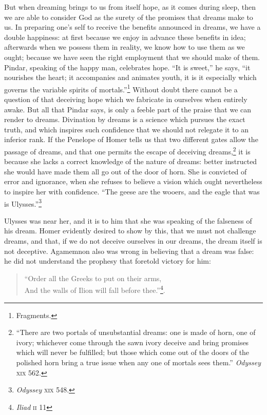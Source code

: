 \documentclass[12pt]{article}
\begin{document}
But when dreaming brings to us from itself hope, as it comes during sleep, then
we are able to consider God as the surety of the promises that dreams make to
us. In preparing one's self to receive the benefits announced in dreams, we
have a double happiness: at first because we enjoy in advance these benefits in
idea; afterwards when we possess them in reality, we know how to use them as we
ought; because we have seen the right employment that we should make of them.
Pindar, speaking of the happy man, celebrates hope. ``It is sweet,'' he says,
``it nourishes the heart; it accompanies and animates youth, it is it
especially which governs the variable spirits of
mortals.''\footnote{Fragments.} Without doubt there cannot be a question of
that deceiving hope which we fabricate in ourselves when entirely awake. But
all that Pindar says, is only a feeble part of the praise that we can render to
dreams. Divination by dreams is a science which pursues the exact truth, and
which inspires such confidence that we should not relegate it to an inferior
rank. If the Penelope of Homer tells us that two different gates allow the
passage of dreams, and that one permits the escape of deceiving
dreams,\footnote{\-``There are two portals of unsubstantial dreams: one is made
of horn, one of ivory; whichever come through the sawn ivory deceive and bring
promises which will never be fulfilled; but those which come out of the doors
of the polished horn bring a true issue when any one of mortals sees them.''
\textit{Odyssey} \textsc{xix} 562.} it is because she lacks a correct knowledge
of the nature of dreams: better instructed she would have made them all go out
of the door of horn. She is convicted of error and ignorance, when she refuses
to believe a vision which ought nevertheless to inspire her with confidence.
``The geese are the wooers, and the eagle that was is
Ulysses.''\footnote{\textit{Odyssey} \textsc{xix} 548.}

Ulysses was near her, and it is to him that she was speaking of the falseness
of his dream. Homer evidently desired to show by this, that we must not
challenge dreams, and that, if we do not deceive ourselves in our dreams, the
dream itself is not deceptive. Agamemnon also was wrong in believing that a
dream was false: he did not understand the prophesy that foretold victory for
him:

\begin{verse}
``Order all the Greeks to put on their arms,\\
And the walls of Ilion will fall before thee.''\footnote{\textit{Iliad}
\textsc{ii} 11}.
\end{verse}
\end{document}
